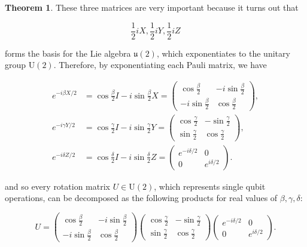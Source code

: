 \documentclass{article}
\theoremstyle{definition}
\newtheorem{theorem}{Theorem}[section]
\begin{document}
      \begin{theorem}
        These three matrices are very important because it turns out that

          \[\frac{1}{2} i X, \frac{1}{2} i Y, \frac{1}{2} i Z\]

        forms the basis for the Lie algebra $\mathfrak{u}(2)$, which exponentiates to the unitary group $\text{U}(2)$. Therefore, by exponentiating each Pauli matrix, we have

        \begin{align*}
          e^{-i \beta X /2} &= \cos \frac{\beta}{2} I - i \sin \frac{\beta}{2} X = \begin{pmatrix} \cos \frac{\beta}{2} & -i \sin \frac{\beta}{2} \\ -i \sin \frac{\beta}{2} & \cos \frac{\beta}{2} \end{pmatrix}, \\
          e^{-i \gamma Y/2} &= \cos \frac{\gamma}{2} I - i \sin \frac{\gamma}{2} Y = \begin{pmatrix} \cos \frac{\gamma}{2} & - \sin \frac{\gamma}{2} \\ \sin \frac{\gamma}{2} & \cos \frac{\gamma}{2} \end{pmatrix}, \\
          e^{-i \delta Z/2} &= \cos \frac{\delta}{2} I - i \sin \frac{\delta}{2} Z = \begin{pmatrix} e^{-i \delta /2} & 0 \\ 0 & e^{i\delta/2} \end{pmatrix}.
        \end{align*}

        and so every rotation matrix $U \in \text{U}(2)$, which represents single qubit operations, can be decomposed as the following products for real values of $\beta, \gamma, \delta$:

        \[
          U = \begin{pmatrix} \cos \frac{\beta}{2} & -i \sin \frac{\beta}{2} \\ -i \sin \frac{\beta}{2} & \cos \frac{\beta}{2} \end{pmatrix} \begin{pmatrix} \cos \frac{\gamma}{2} & - \sin \frac{\gamma}{2} \\ \sin \frac{\gamma}{2} & \cos \frac{\gamma}{2} \end{pmatrix} \begin{pmatrix} e^{-i \delta /2} & 0 \\ 0 & e^{i\delta/2} \end{pmatrix}.
        \]
      \end{theorem}
\end{document}
